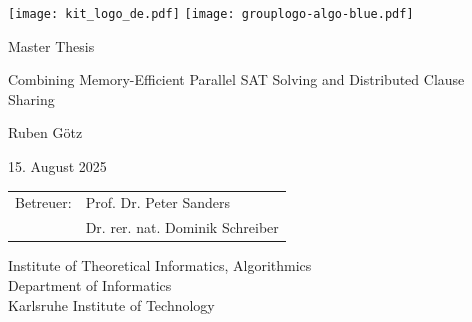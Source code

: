 \documentclass[12pt,a4paper,twoside]{scrartcl}
\numberwithin{equation}{section}
\begin{document}

\pagestyle{empty} %

\begin{titlepage}

  \begin{center}\large

    \quad\texttt{[image: kit\_logo\_de.pdf]} \hfill
    \texttt{[image: grouplogo-algo-blue.pdf]}\quad\null

    \vfill

    Master Thesis
    \vspace*{2cm}

    {\huge 	Combining Memory-Efficient Parallel SAT Solving and Distributed Clause Sharing \par}

    \vfill

    Ruben Götz

    \vspace*{15mm}

    15. August 2025

    \vspace*{45mm}

    \begin{tabular}{rl}
      Betreuer: & Prof. Dr. Peter Sanders \\
      & Dr. rer. nat. Dominik Schreiber \\
    \end{tabular}
    
    \vspace*{10mm}


    Institute of Theoretical Informatics, Algorithmics \\
    Department of Informatics \\
    Karlsruhe Institute of Technology

    \vspace*{12mm}
  \end{center}

\end{titlepage}
\end{document}
